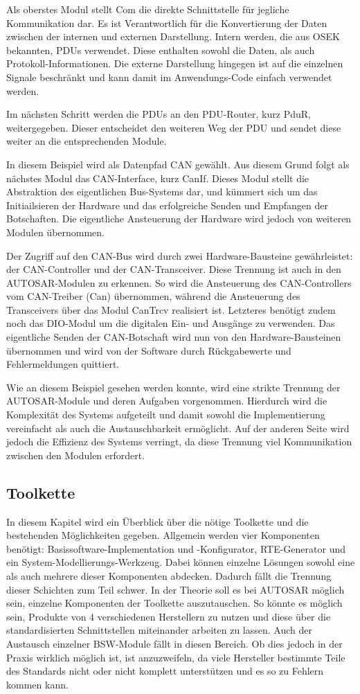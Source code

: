 \documentclass[
  a4paper,					    %
  twoside,
  DIV=calc,     				%
  bibliography=totoc,
  cleardoublepage=empty,
  ngerman,     					%
  final       					%
]{scrbook}
\begin{document}
Als oberstes Modul stellt Com die direkte Schnittstelle für jegliche Kommunikation dar. Es ist Verantwortlich für die Konvertierung der Daten zwischen der internen und externen Darstellung. Intern werden, die aus OSEK bekannten, PDUs verwendet. Diese enthalten sowohl die Daten, als auch Protokoll-Informationen. Die externe Darstellung hingegen ist auf die einzelnen Signale beschränkt und kann damit im Anwendungs-Code einfach verwendet werden.

Im nächsten Schritt werden die PDUs an den PDU-Router, kurz PduR, weitergegeben. Dieser entscheidet den weiteren Weg der PDU und sendet diese weiter an die entsprechenden Module.

In diesem Beispiel wird als Datenpfad CAN gewählt. Aus diesem Grund folgt als nächstes Modul das CAN-Interface, kurz CanIf. Dieses Modul stellt die Abstraktion des eigentlichen Bus-Systems dar, und kümmert sich um das Initiailsieren der Hardware und das erfolgreiche Senden und Empfangen der Botschaften. Die eigentliche Ansteuerung der Hardware wird jedoch von weiteren Modulen übernommen.

Der Zugriff auf den CAN-Bus wird durch zwei Hardware-Bausteine gewährleistet: der CAN-Controller und der CAN-Transceiver. Diese Trennung ist auch in den AUTOSAR-Modulen zu erkennen. So wird die Ansteuerung des CAN-Controllers vom CAN-Treiber (Can) übernommen, während die Ansteuerung des Transceivers über das Modul CanTrcv realisiert ist. Letzteres benötigt zudem noch das DIO-Modul um die digitalen Ein- und Ausgänge zu verwenden. Das eigentliche Senden der CAN-Botschaft wird nun von den Hardware-Bausteinen übernommen und wird von der Software durch Rückgabewerte und Fehlermeldungen quittiert.

Wie an diesem Beispiel gesehen werden konnte, wird eine strikte Trennung der AUTOSAR-Module und deren Aufgaben vorgenommen. Hierdurch wird die Komplexität des Systems aufgeteilt und damit sowohl die Implementierung vereinfacht als auch die Austauschbarkeit ermöglicht. Auf der anderen Seite wird jedoch die Effizienz des Systems verringt, da diese Trennung viel Kommunikation zwischen den Modulen erfordert.


\subsection{Toolkette}
\label{sec:Toolkette}
In diesem Kapitel wird ein Überblick über die nötige Toolkette und die bestehenden Möglichkeiten gegeben. Allgemein werden vier Komponenten benötigt: Basissoftware-Implementation und -Konfigurator, RTE-Generator und ein System-Modellierungs-Werkzeug. Dabei können einzelne Lösungen sowohl eine als auch mehrere dieser Komponenten abdecken. Dadurch fällt die Trennung dieser Schichten zum Teil schwer. In der Theorie soll es bei AUTOSAR möglich sein, einzelne Komponenten der Toolkette auszutauschen. So könnte es möglich sein, Produkte von 4 verschiedenen Herstellern zu nutzen und diese über die standardisierten Schnittstellen miteinander arbeiten zu lassen. Auch der Austausch einzelner BSW-Module fällt in diesen Bereich. Ob dies jedoch in der Praxis wirklich möglich ist, ist anzuzweifeln, da viele Hersteller bestimmte Teile des Standards nicht oder nicht komplett unterstützen und es so zu Fehlern kommen kann.
\end{document}
